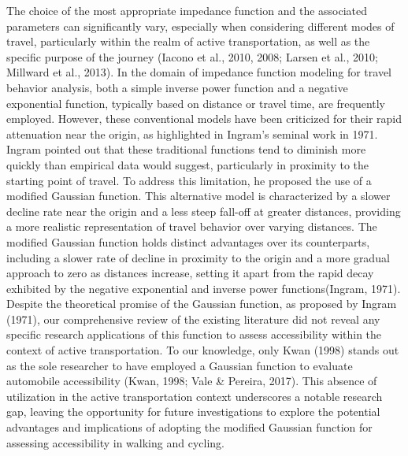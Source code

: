 \documentclass[
11pt, %
oneside, %
english, %
singlespacing, %
]{macthesis} %
\begin{document}
The choice of the most appropriate impedance function and the associated parameters can significantly vary, especially when considering different modes of travel, particularly within the realm of active transportation, as well as the specific purpose of the journey (Iacono et al., 2010, 2008; Larsen et al., 2010; Millward et al., 2013). In the domain of impedance function modeling for travel behavior analysis, both a simple inverse power function and a negative exponential function, typically based on distance or travel time, are frequently employed. However, these conventional models have been criticized for their rapid attenuation near the origin, as highlighted in Ingram's seminal work in 1971. Ingram pointed out that these traditional functions tend to diminish more quickly than empirical data would suggest, particularly in proximity to the starting point of travel. To address this limitation, he proposed the use of a modified Gaussian function. This alternative model is characterized by a slower decline rate near the origin and a less steep fall-off at greater distances, providing a more realistic representation of travel behavior over varying distances. The modified Gaussian function holds distinct advantages over its counterparts, including a slower rate of decline in proximity to the origin and a more gradual approach to zero as distances increase, setting it apart from the rapid decay exhibited by the negative exponential and inverse power functions(Ingram, 1971). Despite the theoretical promise of the Gaussian function, as proposed by Ingram (1971), our comprehensive review of the existing literature did not reveal any specific research applications of this function to assess accessibility within the context of active transportation. To our knowledge, only Kwan (1998) stands out as the sole researcher to have employed a Gaussian function to evaluate automobile accessibility (Kwan, 1998; Vale \& Pereira, 2017). This absence of utilization in the active transportation context underscores a notable research gap, leaving the opportunity for future investigations to explore the potential advantages and implications of adopting the modified Gaussian function for assessing accessibility in walking and cycling.
\end{document}
